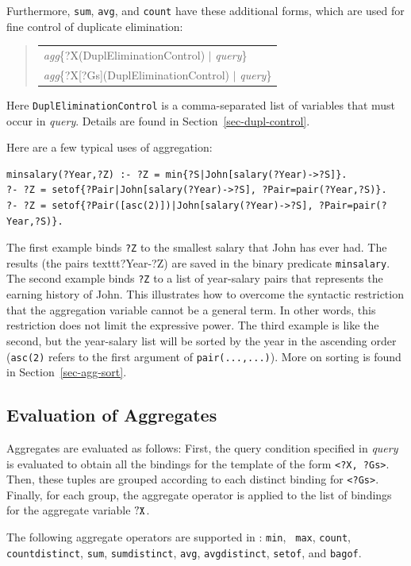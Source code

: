 \documentclass[11pt]{article}
\newcommand{\ERGO}{\mbox{\smaller{\ensuremath{\cal{E}}\smaller{{\sc{RGO}}}}}\xspace}
\newcommand{\FLSYSTEM}{\ERGO}
\newenvironment{qrules}{\begin{quote}\tt\begin{tabular}[t]{l}}%
{\end{tabular}\end{quote}}
\begin{document}
Furthermore, \texttt{sum}, \texttt{avg}, and \texttt{count} have these
additional forms, which are used for fine control of duplicate elimination:
\begin{qrules}
\textnormal{\emph{agg}}\{?X(DuplEliminationControl) $|$ {\it query}\}\\
\textnormal{\emph{agg}}\{?X[?Gs](DuplEliminationControl) $|$ {\it query}\}
\end{qrules}
Here \texttt{DuplEliminationControl} is a comma-separated list of variables
that must occur in \emph{query}. Details are found in
Section~\ref{sec-dupl-control}.  

\noindent
Here are a few typical uses of aggregation:
\begin{verbatim}
minsalary(?Year,?Z) :- ?Z = min{?S|John[salary(?Year)->?S]}.
?- ?Z = setof{?Pair|John[salary(?Year)->?S], ?Pair=pair(?Year,?S)}.
?- ?Z = setof{?Pair([asc(2)])|John[salary(?Year)->?S], ?Pair=pair(?Year,?S)}.
\end{verbatim}
The first example binds \texttt{?Z} to the smallest salary that John has
ever had. The results (the pairs texttt{?Year-?Z}) are saved in the binary predicate \texttt{minsalary}.
The second example binds \texttt{?Z} to a list of year-salary   
pairs that represents the earning history of John.
This illustrates how to overcome the syntactic restriction
that the aggregation variable cannot be a general term.
In other words, this restriction does not limit the expressive power.
The third example is like the second, but the year-salary list will be
sorted by the year in the ascending order (\texttt{asc(2)} refers to the
first argument of \texttt{pair(...,...)}). More on sorting is found in
Section~\ref{sec-agg-sort}.


\subsection{Evaluation of Aggregates}\label{sec-aggr-eval}

Aggregates are evaluated as follows: First, the query
condition specified in {\it query} is evaluated to obtain all the bindings
for the template of the form {\tt \texttt{<}?X, ?Gs\texttt{>}}. Then, these
tuples are grouped according to each distinct binding for
{\tt \texttt{<}?Gs\texttt{>}}. Finally, for each group, the aggregate operator
is applied to the list of bindings for the aggregate variable $\tt ?X$.


%
The following aggregate operators are supported in \FLSYSTEM: {\tt min}, {\tt
  max}, {\tt count}, \texttt{countdistinct},
{\tt sum}, \texttt{sumdistinct},  {\tt avg}, \texttt{avgdistinct},
{\tt setof}, and {\tt bagof}. 
\end{document}
